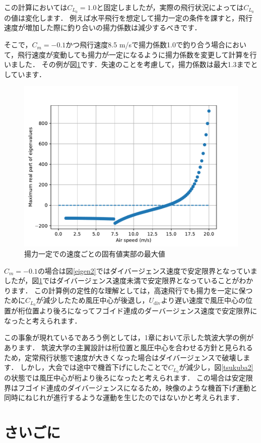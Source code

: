 \documentclass{jarticle}
\begin{document}
この計算においては$C_{L_0}=1.0$と固定しましたが，実際の飛行状況によっては$C_{L_0}$の値は変化します．
例えば水平飛行を想定して揚力一定の条件を課すと，飛行速度が増加した際に釣り合いの揚力係数は減少するべきです．

そこで，$C_m=-0.1$かつ飛行速度8.5 m/sで揚力係数1.0で釣り合う場合において，飛行速度が変動しても揚力が一定になるように揚力係数を変更して計算を行いました．
その例が図\ref{eigen3}です．失速のことを考慮して，揚力係数は最大1.3までとしています．
\begin{figure}[H]
    \centering
    \includegraphics[width=0.7\linewidth]{image/Eigenvalues_of_phugoid-divergence-modal-varCL-0.1.pdf}
    \caption{揚力一定での速度ごとの固有値実部の最大値}
    \label{eigen3}
\end{figure}
$C_m=-0.1$の場合は図\ref{eigen2}ではダイバージェンス速度で安定限界となっていましたが，図\ref{eigen3}ではダイバージェンス速度未満で安定限界となっていることがわかります．
この計算例の定性的な理解としては，高速飛行でも揚力を一定に保つために$C_{L_0}$が減少したため風圧中心が後退し，$U_\mathrm{div}$より遅い速度で風圧中心の位置が桁位置より後ろになってフゴイド連成のダーバージェンス速度で安定限界になったと考えられます．

この事象が現れているであろう例としては，1章において示した筑波大学の例があります．
筑波大学の主翼設計は桁位置と風圧中心を合わせる方針と見られるため，定常飛行状態で速度が大きくなった場合はダイバージェンスで破壊します．
しかし，大会では途中で機首下げにしたことで$C_{L_0}$が減少し，図\ref{tsukuba2}の状態では風圧中心が桁より後ろになったと考えられます．
この場合は安定限界はフゴイド連成のダイバージェンスになるため，映像のような機首下げ運動と同時にねじれが進行するような運動を生じたのではないかと考えられます．

\section{さいごに}
\end{document}

